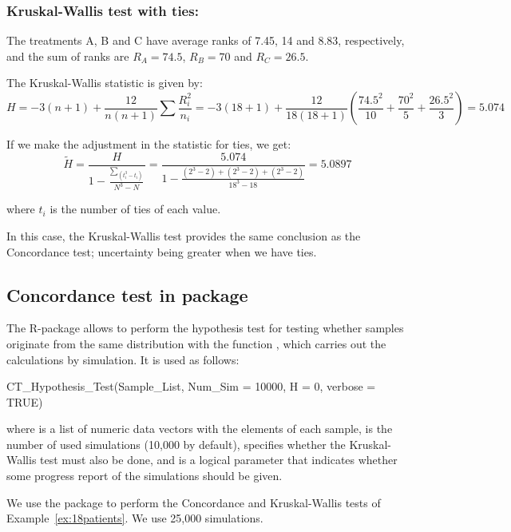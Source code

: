 \subsubsection{Kruskal-Wallis test with ties:}

The treatments A, B and C have average ranks of 7.45, 14 and 8.83, respectively, and the sum of ranks are $R_A=74.5$, $R_B=70$ and $R_C=26.5$.

The Kruskal-Wallis statistic is given by:
$$H = -3(n+1)+\frac{12}{n(n+1)}\sum \frac{R_i^2}{n_i}= -3(18+1)+\frac{12}{18(18+1)}\left( \frac{74.5^2}{10} +\frac{70^2}{5}+\frac{26.5^2}{3}\right)=5.074$$

If we make the adjustment in the statistic for ties, we get:
$$\tilde{H} = \frac{H}{\displaystyle 1-\frac{ \sum_(t_i^3-t_i)}{N^3-N}} = \frac{5.074}{\displaystyle 1-\frac{(2^3-2)+(2^3-2)+(2^3-2)}{18^3-18}}=\displaystyle 5.0897$$

where $t_i$ is the number of ties of each value.
 
In this case, the Kruskal-Wallis test provides the same conclusion as the Concordance test; uncertainty being greater when we have ties. 

\subsection{Concordance test in  package}

The   R-package  allows to perform the hypothesis test for testing whether samples originate from the same distribution with the function , which carries out  the calculations by simulation. It is used as follows:
\begin{example}
CT_Hypothesis_Test(Sample_List, Num_Sim = 10000, H = 0, verbose = TRUE)
\end{example}
where  is a list of numeric data vectors with the elements of each sample,  is the number of used simulations (10,000 by default),  specifies whether the Kruskal-Wallis test must also be done, and  is a logical parameter that indicates whether some progress report of the simulations should be given.

\setcounter{exmp}{1}
\begin{exmp}[Cont.] 
We use the  package to perform the Concordance and Kruskal-Wallis tests of Example~\ref{ex:18patients}. We use 25,000 simulations.
\end{exmp} 
%

